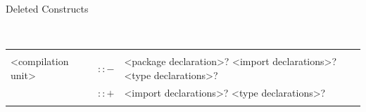\documentclass[landscape, 11pt]{article}
\begin{document}
\def\arraystretch{1}

\begin{qsection}{Deleted Constructs}

	\begin{enumerate}[label=\bt{\theenumi.}]
		\tt
		\ditem[Programs.]

			\begin{longtable}{R{7cm} c L{15cm}}
													&					&	 \\
				<compilation unit>							&	$\colon\colon-$	&	<package declaration>? <import declarations>? <type declarations>? \\
															&	$\colon\colon+$	&	<import declarations>? <type declarations>? \\\\
			\end{longtable}
		\ditem[Declarations.]


\end{enumerate}
\end{qsection}
\end{document}
